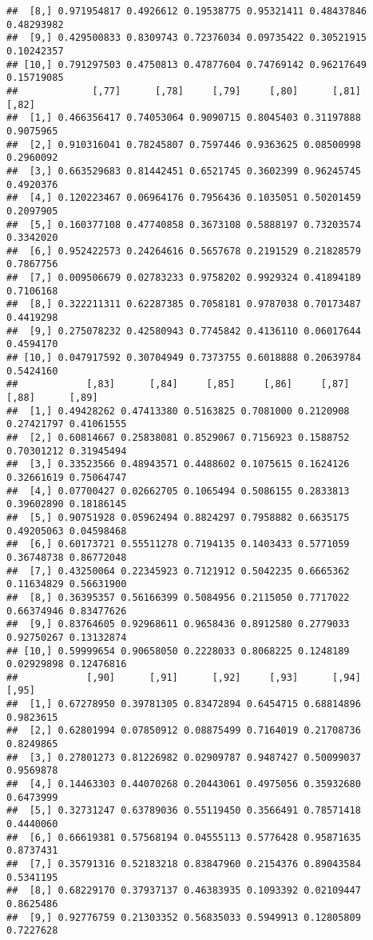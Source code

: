 \documentclass[
]{article}
\begin{document}
\begin{verbatim}
##  [8,] 0.971954817 0.4926612 0.19538775 0.95321411 0.48437846 0.48293982
##  [9,] 0.429500833 0.8309743 0.72376034 0.09735422 0.30521915 0.10242357
## [10,] 0.791297503 0.4750813 0.47877604 0.74769142 0.96217649 0.15719085
##             [,77]      [,78]     [,79]     [,80]      [,81]     [,82]
##  [1,] 0.466356417 0.74053064 0.9090715 0.8045403 0.31197888 0.9075965
##  [2,] 0.910316041 0.78245807 0.7597446 0.9363625 0.08500998 0.2960092
##  [3,] 0.663529683 0.81442451 0.6521745 0.3602399 0.96245745 0.4920376
##  [4,] 0.120223467 0.06964176 0.7956436 0.1035051 0.50201459 0.2097905
##  [5,] 0.160377108 0.47740858 0.3673108 0.5888197 0.73203574 0.3342020
##  [6,] 0.952422573 0.24264616 0.5657678 0.2191529 0.21828579 0.7867756
##  [7,] 0.009506679 0.02783233 0.9758202 0.9929324 0.41894189 0.7106168
##  [8,] 0.322211311 0.62287385 0.7058181 0.9787038 0.70173487 0.4419298
##  [9,] 0.275078232 0.42580943 0.7745842 0.4136110 0.06017644 0.4594170
## [10,] 0.047917592 0.30704949 0.7373755 0.6018888 0.20639784 0.5424160
##            [,83]      [,84]     [,85]     [,86]     [,87]      [,88]      [,89]
##  [1,] 0.49428262 0.47413380 0.5163825 0.7081000 0.2120908 0.27421797 0.41061555
##  [2,] 0.60814667 0.25838081 0.8529067 0.7156923 0.1588752 0.70301212 0.31945494
##  [3,] 0.33523566 0.48943571 0.4488602 0.1075615 0.1624126 0.32661619 0.75064747
##  [4,] 0.07700427 0.02662705 0.1065494 0.5086155 0.2833813 0.39602890 0.18186145
##  [5,] 0.90751928 0.05962494 0.8824297 0.7958882 0.6635175 0.49205063 0.04598468
##  [6,] 0.60173721 0.55511278 0.7194135 0.1403433 0.5771059 0.36748738 0.86772048
##  [7,] 0.43250064 0.22345923 0.7121912 0.5042235 0.6665362 0.11634829 0.56631900
##  [8,] 0.36395357 0.56166399 0.5084956 0.2115050 0.7717022 0.66374946 0.83477626
##  [9,] 0.83764605 0.92968611 0.9658436 0.8912580 0.2779033 0.92750267 0.13132874
## [10,] 0.59999654 0.90658050 0.2228033 0.8068225 0.1248189 0.02929898 0.12476816
##            [,90]      [,91]      [,92]     [,93]      [,94]     [,95]
##  [1,] 0.67278950 0.39781305 0.83472894 0.6454715 0.68814896 0.9823615
##  [2,] 0.62801994 0.07850912 0.08875499 0.7164019 0.21708736 0.8249865
##  [3,] 0.27801273 0.81226982 0.02909787 0.9487427 0.50099037 0.9569878
##  [4,] 0.14463303 0.44070268 0.20443061 0.4975056 0.35932680 0.6473999
##  [5,] 0.32731247 0.63789036 0.55119450 0.3566491 0.78571418 0.4440060
##  [6,] 0.66619381 0.57568194 0.04555113 0.5776428 0.95871635 0.8737431
##  [7,] 0.35791316 0.52183218 0.83847960 0.2154376 0.89043584 0.5341195
##  [8,] 0.68229170 0.37937137 0.46383935 0.1093392 0.02109447 0.8625486
##  [9,] 0.92776759 0.21303352 0.56835033 0.5949913 0.12805809 0.7227628

\end{verbatim}
\end{document}
